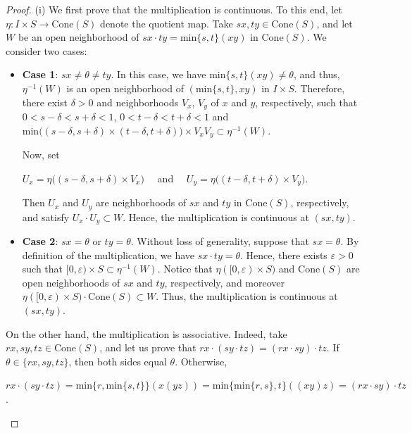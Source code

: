 \documentclass[12pt]{amsart}
\theoremstyle{definition}
\begin{document}
	\begin{proof}
		
		(i) We first prove that the multiplication is continuous. To this end, let $\eta: I\times S\rightarrow \mathrm{Cone}(S)$ denote the quotient map. Take $sx, ty\in \mathrm{Cone}(S)$, and let $W$ be an open neighborhood of $sx\cdot ty=\text{min}\{s,t\}(xy)$ in $\mathrm{Cone}(S)$. We consider two cases:
		\begin{itemize}
			\item \textbf{Case 1}: $sx\neq \theta\neq ty$. In this case, we have $\text{min}\{s,t\}(xy)\neq \theta$, and thus, $\eta^{-1}(W)$ is an open neighborhood of $(\text{min}\{s,t\}, xy)$ in $I\times S$. Therefore, there exist $\delta>0$ and neighborhoods $V_x$, $V_y$ of $x$ and $y$, respectively, such that $0<s-\delta<s+\delta<1$, $0<t-\delta<t+\delta<1$ and $\text{min}\big((s-\delta,s+\delta)\times (t-\delta,t+\delta)\big)\times V_xV_y\subset \eta^{-1}(W)$. 
			
			Now, set
			
			\begin{center}
				$U_x=\eta\big((s-\delta,s+\delta)\times V_x\big)\quad$ and $\quad U_y=\eta\big((t-\delta,t+\delta)\times V_y\big)$.
			\end{center}
			
			Then $U_x$ and $U_y$ are neighborhoods of $sx$ and $ty$ in $\mathrm{Cone}(S)$, respectively, and satisfy $U_x\cdot U_y\subset W$. Hence, the multiplication is continuous at $(sx,ty)$.
			
			\item \textbf{Case 2}: $sx=\theta$ or $ty=\theta$. Without loss of generality, suppose that $sx=\theta$. By definition of the multiplication, we have $sx\cdot ty=\theta$. Hence, there exists $\varepsilon > 0$ such that $[0,\varepsilon)\times S\subset \eta^{-1}(W)$. Notice that $\eta([0,\varepsilon)\times S)$ and $\mathrm{Cone}(S)$ are open neighborhoods of $sx$ and $ty$, respectively, and moreover $\eta([0,\varepsilon)\times S)\cdot \mathrm{Cone}(S)\subset W$. Thus, the multiplication is continuous at $(sx,ty)$.
		\end{itemize}
		
		
		
		On the other hand, the multiplication is associative. Indeed, take $rx,sy,tz\in \mathrm{Cone}(S)$, and let us prove that $rx\cdot(sy\cdot tz)=(rx\cdot sy)\cdot tz$. If $\theta \in \{rx, sy, tz\}$, then both sides equal $\theta$. Otherwise,
		\begin{center}
			$rx\cdot(sy\cdot tz)=\mbox{min}\{r,\mbox{min}\{s,t\}\}(x(yz))=\mbox{min}\{\mbox{min}\{r,s\},t\}((xy)z)=(rx\cdot sy)\cdot tz$.  
		\end{center}
		

\end{proof}
\end{document}
